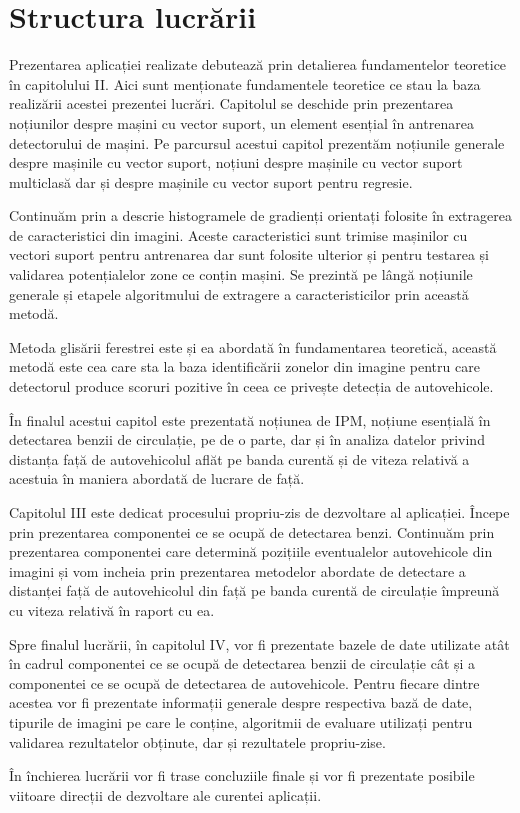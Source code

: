 \section{Structura lucrării}

Prezentarea aplicației realizate debutează prin detalierea fundamentelor teoretice în capitolului II. Aici sunt menționate fundamentele teoretice ce stau la baza realizării acestei prezentei lucrări. 
Capitolul se deschide prin prezentarea noțiunilor despre mașini cu vector suport, un element esențial în antrenarea detectorului de mașini. Pe parcursul acestui capitol prezentăm noțiunile generale despre mașinile cu vector suport, noțiuni despre mașinile cu vector suport multiclasă dar și despre mașinile cu vector suport pentru regresie.

Continuăm prin a descrie histogramele de gradienți orientați folosite în extragerea de caracteristici din imagini. Aceste caracteristici sunt trimise mașinilor cu vectori suport pentru antrenarea dar sunt folosite ulterior și pentru testarea și validarea potențialelor zone ce conțin mașini. 
Se prezintă pe lângă noțiunile generale și etapele algoritmului de extragere a caracteristicilor prin această metodă. 

Metoda glisării ferestrei este și ea abordată în fundamentarea teoretică, această metodă este cea care sta la baza identificării zonelor din imagine pentru care detectorul produce scoruri pozitive în ceea ce privește detecția de autovehicole.

În finalul acestui capitol este prezentată noțiunea de IPM, noțiune esențială în detectarea benzii de circulație, pe de o parte, dar și în analiza datelor privind distanța față de autovehicolul aflăt pe banda curentă și de viteza relativă a acestuia în maniera abordată de lucrare de față.

Capitolul III este dedicat procesului propriu-zis de dezvoltare al aplicației. Începe prin prezentarea componentei ce se ocupă de detectarea benzi. Continuăm prin prezentarea componentei care determină pozițiile eventualelor autovehicole din imagini și vom incheia prin prezentarea metodelor abordate de detectare a distanței față de autovehicolul din față pe banda curentă de circulație împreună cu viteza relativă în raport cu ea.

Spre finalul lucrării, în capitolul IV, vor fi prezentate bazele de date utilizate atât în cadrul componentei ce se ocupă de detectarea benzii de circulație cât și a componentei ce se ocupă de detectarea de autovehicole. Pentru fiecare dintre acestea vor fi prezentate informații generale despre respectiva bază de date, tipurile de imagini pe care le conține, algoritmii de evaluare utilizați pentru validarea rezultatelor obținute, dar și rezultatele propriu-zise.

În închierea lucrării vor fi trase concluziile finale și vor fi prezentate posibile viitoare direcții de dezvoltare ale curentei aplicații.